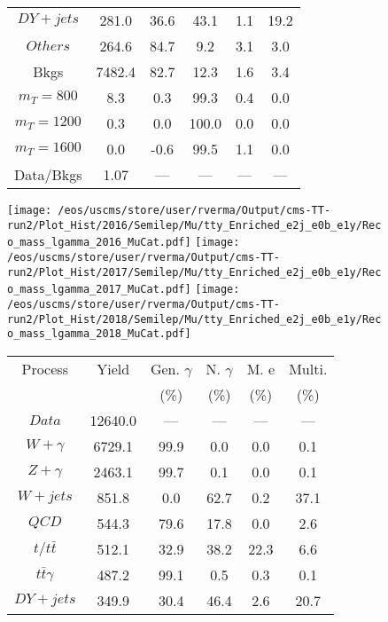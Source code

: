 \begin{figure}
\begin{minipage}[c]{0.32\textwidth}
{\begin{tabular}{cccccc}
$ DY+jets $ &  281.0 &  36.6 &  43.1 &  1.1 &  19.2\\
$ Others $ &  264.6 &  84.7 &  9.2 &  3.1 &  3.0\\
Bkgs &  7482.4 &  82.7 &  12.3 &  1.6 &  3.4\\
$ m_{T} = 800 $ &  8.3 &  0.3 &  99.3 &  0.4 &  0.0\\
$ m_{T} = 1200 $ &  0.3 &  0.0 &  100.0 &  0.0 &  0.0\\
$ m_{T} = 1600 $ &  0.0 &  -0.6 &  99.5 &  1.1 &  0.0\\
Data/Bkgs &  1.07 &  --- &  --- &  --- &  ---\\
\hline
\end{tabular}
}
\end{minipage}
\end{figure}

\begin{figure}
\centering
\texttt{[image: /eos/uscms/store/user/rverma/Output/cms-TT-run2/Plot\_Hist/2016/Semilep/Mu/tty\_Enriched\_e2j\_e0b\_e1y/Reco\_mass\_lgamma\_2016\_MuCat.pdf]}
\texttt{[image: /eos/uscms/store/user/rverma/Output/cms-TT-run2/Plot\_Hist/2017/Semilep/Mu/tty\_Enriched\_e2j\_e0b\_e1y/Reco\_mass\_lgamma\_2017\_MuCat.pdf]}
\texttt{[image: /eos/uscms/store/user/rverma/Output/cms-TT-run2/Plot\_Hist/2018/Semilep/Mu/tty\_Enriched\_e2j\_e0b\_e1y/Reco\_mass\_lgamma\_2018\_MuCat.pdf]}
\begin{minipage}[c]{0.32\textwidth}
\centering
\tiny{
\begin{tabular}{cccccc}
\hline
Process & Yield & Gen. $\gamma$ & N. $\gamma$ & M. e & Multi. \\
 &  & (\%) & (\%) & (\%) & (\%)  \\
\hline
                                                                      $ Data $ &  12640.0 &  --- &  --- &  --- &  ---\\
$ W+\gamma $ &  6729.1 &  99.9 &  0.0 &  0.0 &  0.1\\
$ Z+\gamma $ &  2463.1 &  99.7 &  0.1 &  0.0 &  0.1\\
$ W+jets $ &  851.8 &  0.0 &  62.7 &  0.2 &  37.1\\
$ QCD $ &  544.3 &  79.6 &  17.8 &  0.0 &  2.6\\
$ t/t\bar{t} $ &  512.1 &  32.9 &  38.2 &  22.3 &  6.6\\
$ t\bar{t}\gamma $ &  487.2 &  99.1 &  0.5 &  0.3 &  0.1\\
$ DY+jets $ &  349.9 &  30.4 &  46.4 &  2.6 &  20.7\\

\end{tabular}}
\end{minipage}
\end{figure}
